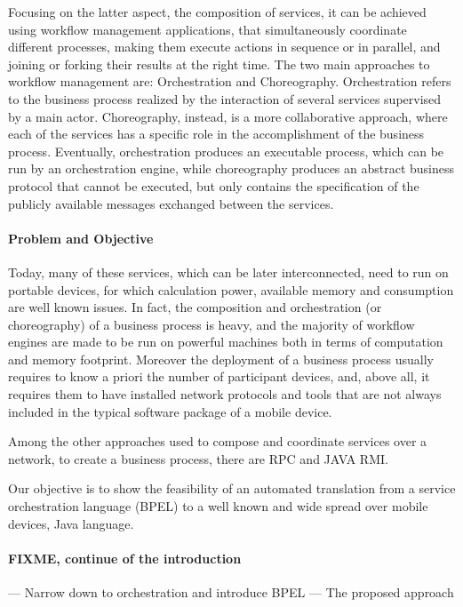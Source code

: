 Focusing on the latter aspect, the composition of services, it can be achieved using workflow management applications, that simultaneously coordinate different processes, making them execute actions in sequence or in parallel, and joining or forking their results at the right time. %
The two main approaches to workflow management are: Orchestration and Choreography.
Orchestration refers to the %
business process realized by the interaction of several services supervised by a main actor. Choreography, instead, is a more collaborative approach, where each of the services has a specific role in the accomplishment of the business process. Eventually, orchestration produces an executable process, which can be run by an orchestration engine, while choreography produces an abstract business protocol that cannot be executed, but only contains the specification of the publicly available messages exchanged between the services.

\paragraph{Problem and Objective}
Today, many of these services, which can be later interconnected, need to run on portable devices, for which calculation power, available memory and consumption are well known issues. In fact, the composition and orchestration (or choreography) of a business process is heavy, and the majority of workflow engines are made to be run on powerful machines both in terms of computation and memory footprint. Moreover the deployment of a business process usually requires to know a priori the number of participant devices, and, above all, it requires them to have installed network protocols and tools that are not always included in the typical software package of a mobile device. 

Among the other approaches used to compose and coordinate services over a network, to create a business process, there are RPC and JAVA RMI.

Our objective is to show the feasibility of an automated translation from a service orchestration language (BPEL) to a well known and wide spread over mobile devices, Java language. 

\paragraph{FIXME, continue of the introduction}
--- Narrow down to orchestration and introduce BPEL 
--- The proposed approach 

